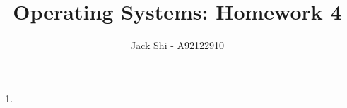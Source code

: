 \documentclass{article}
\title{Operating Systems: Homework 4}
\author{Jack Shi - A92122910}
\begin{document}
\maketitle

\begin{enumerate} [label=\textbf{\arabic*}.]
	\item
\end{enumerate}
\end{document}

